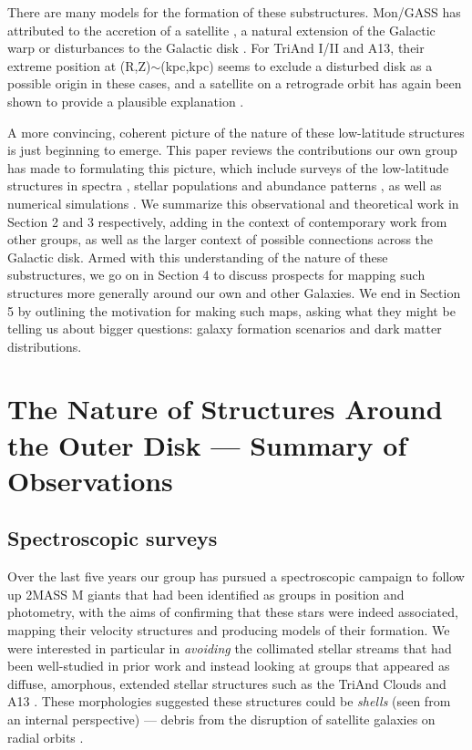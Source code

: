 \documentclass[galaxies,article,submit,moreauthors,pdftex,10pt,a4paper]{mdpi}
\begin{document}
There are many models for the formation of these substructures.
Mon/GASS has attributed to the accretion of a satellite \citep[on a retrograde orbit][]{penarrubia05, michel-dansac11}, a natural extension of the Galactic warp \citep{momany04,momany06} or disturbances to the Galactic disk \citep{kazantzidis08,younger08,purcell11,gomez16}.
For TriAnd I/II and A13, their extreme position at (R,Z)$\sim$(kpc,kpc) seems to exclude a disturbed disk as a possible origin in these cases, and a satellite on a retrograde orbit has again been shown to provide a plausible explanation \citep{sheffield14}.

A more convincing, coherent picture of the nature of these low-latitude structures is just beginning to emerge.
This paper reviews the contributions our own group has made to formulating this picture, which include surveys of the low-latitude structures in spectra \citep{sheffield14,ting17}, stellar populations \citep{pricewhelan15,sheffield17} and abundance patterns \citep{bergemann17}, as well as numerical simulations \citep{sheffield14,laporte17a,laporte17b}.
We summarize this observational and theoretical work in Section 2 and 3 respectively, adding in the context of contemporary work from other groups, as well as the larger context of possible connections across the Galactic disk.
Armed with this understanding of the nature of these substructures, we go on in Section 4 to discuss prospects for mapping such structures more generally around our own and other Galaxies.
We end in Section 5 by outlining the motivation for making such maps, asking what they might be telling us about bigger questions: galaxy formation scenarios and dark matter distributions.


\section{The Nature of Structures Around the Outer Disk --- Summary of Observations}
\label{sec:obs}
\subsection{Spectroscopic surveys}

Over the last five years our group has pursued a spectroscopic campaign to follow up 2MASS M giants that had been identified as groups in position and photometry, with the aims of confirming that these stars were indeed associated, mapping their velocity structures and producing models of their formation.
We were interested in particular in {\it avoiding} the collimated stellar streams that had been well-studied in prior work \citep[such as Sgr, Orphan, GD1 and Pla 5 --- see, e.g.,][]{law10,koposov10,kuepper15,bovy16}
and instead looking at groups that appeared as diffuse, amorphous, extended stellar structures such as the TriAnd Clouds \citep{rochapinto04} and A13 \citep{sharma10}.
These morphologies suggested these structures could be  {\it shells} (seen from an internal perspective) --- debris from the disruption of satellite galaxies on radial orbits \citep{johnston08}.
\end{document}
